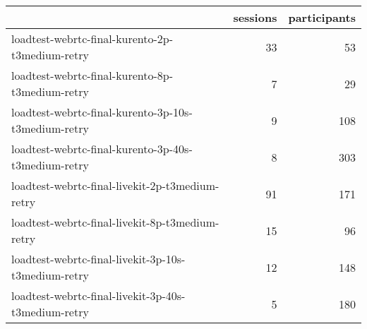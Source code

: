\begin{tabular}{lrr}
\toprule
 & sessions & participants \\
\midrule
loadtest-webrtc-final-kurento-2p-t3medium-retry & 33 & 53 \\
loadtest-webrtc-final-kurento-8p-t3medium-retry & 7 & 29 \\
loadtest-webrtc-final-kurento-3p-10s-t3medium-retry & 9 & 108 \\
loadtest-webrtc-final-kurento-3p-40s-t3medium-retry & 8 & 303 \\
loadtest-webrtc-final-livekit-2p-t3medium-retry & 91 & 171 \\
loadtest-webrtc-final-livekit-8p-t3medium-retry & 15 & 96 \\
loadtest-webrtc-final-livekit-3p-10s-t3medium-retry & 12 & 148 \\
loadtest-webrtc-final-livekit-3p-40s-t3medium-retry & 5 & 180 \\
\bottomrule
\end{tabular}
